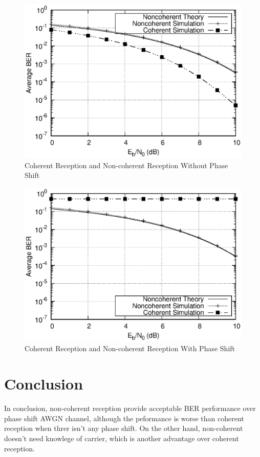 \documentclass[technicalreport]{ieicej}
\begin{document}
\begin{figure}[tbp]
	\begin{center}
		\vspace{0cm}
		\includegraphics[width=\linewidth,clip]{fig/without_shift.eps}
		\caption{Coherent Reception and Non-coherent Reception Without Phase Shift}
		\label{fig:sample}
	\end{center}
\end{figure}

\begin{figure}[tbp]
	\begin{center}
		\vspace{0cm}
		\includegraphics[width=\linewidth,clip]{fig/phase_shift.eps}
		\caption{Coherent Reception and Non-coherent Reception With Phase Shift}
		\label{fig:sample}
	\end{center}
\end{figure}

\section{Conclusion}
In conclusion, non-coherent reception provide acceptable BER performance over phase shift AWGN channel, although the peformance is worse than coherent reception when threr isn't any phase shift. On the other hand, non-coherent doesn't need knowlege of carrier, which is another advantage over coherent reception.
\end{document}

